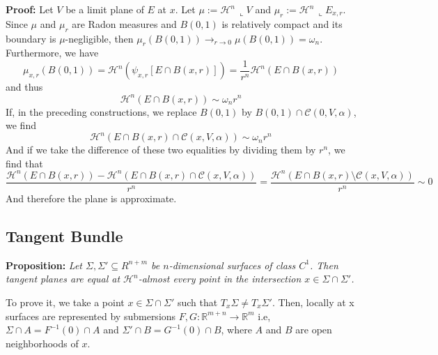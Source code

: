 \documentclass{article}
\begin{document}
\vspace{1ex}
\textbf{Proof:} Let $V$ be a limit plane of $E$ at $x$. Let $\mu:= \mathcal{H}^n
\,\llcorner V$ and $\mu_r:=\mathcal{H}^n\,\llcorner E_{x,r}$. Since $\mu$ and
$\mu_r$ are Radon measures and $B(0,1)$ is relatively compact and its boundary
is $\mu$-negligible, then $\mu_r(B(0,1)) \rightarrow_{r\rightarrow 0}
\mu(B(0,1)) = \omega_n$. Furthermore, we have
\[\mu_{x,r}(B(0,1)) = \mathcal{H}^n(\psi_{x,r}[E\cap B(x, r)]) = \frac{1}{r^n}\mathcal{H}^n(E\cap B(x, r))\]
and thus
\[\mathcal{H}^n(E\cap B(x, r)) \sim \omega_n r^n\]
If, in the preceding constructions, we replace $B(0,1)$ by $B(0,1)\cap\mathcal{C}
(0,V,\alpha)$, we find
\[\mathcal{H}^n(E\cap B(x, r)\cap\mathcal{C}(x,V,\alpha)) \sim \omega_n r^n\]
And if we take the difference of these two equalities by dividing them by $r^n$,
we find that
\[\frac{\mathcal{H}^n(E\cap B(x, r)) - \mathcal{H}^n(E\cap B(x, r)\cap\mathcal{C}(x,V,\alpha))}{r^n} = \frac{\mathcal{H}^n(E\cap B(x, r)\setminus\mathcal{C}(x,V,\alpha))}{r^n} \sim 0\]
And therefore the plane is approximate.

\subsection{Tangent Bundle}
\textbf{Proposition:} \textit{Let $\Sigma, \Sigma′\subseteq R^{n+m}$ be
$n$-dimensional surfaces of class $C^1$. Then tangent planes are equal at 
$\mathcal H^n$-almost every point in the intersection $x∈\Sigma\cap\Sigma′$.}

\vspace{1ex}
To prove it, we take a point $x\in\Sigma\cap\Sigma'$ such that $T_x\Sigma\neq T_x
\Sigma'$. Then, locally at x surfaces are represented by submersions $F,G:\mathbb
R^{m+n}\rightarrow\mathbb R^m$ i.e, $\Sigma\cap A=F^{-1}(0)\cap A$ and
$\Sigma'\cap B=G^{-1}(0)\cap B$, where $A$ and $B$ are open neighborhoods of $x$.
\end{document}
